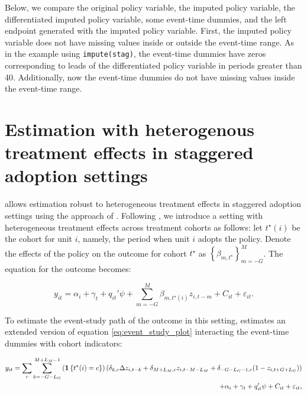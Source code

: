 \documentclass[12pt]{article}
\begin{document}
\begin{stlog}
	\nullskip
\end{stlog}

Below, we compare the original policy variable, the imputed policy variable, the differentiated imputed policy variable, some event-time dummies, and the left endpoint generated with the imputed policy variable.
First, the imputed policy variable does not have missing values inside or outside the event-time range.
As in the example using \texttt{impute(stag)}, the event-time dummies have zeros corresponding to leads of the differentiated policy variable in periods greater than 40. Additionally, now the event-time dummies do not have missing values inside the event-time range.

\begin{stlog}
	\nullskip
\end{stlog}

\section{Estimation with heterogenous treatment effects in staggered adoption settings}
\label{sec:sunabraham}

\xtevent allows estimation robust to heterogeneous treatment effects in staggered adoption settings using the approach of \cite{sun2021estimating}.
Following \cite{freyaldenhoven2021visualization}, we introduce a setting with heterogeneous treatment effects across treatment cohorts as follows:
let $t^{\star} (i)$ be the cohort for unit $i$, namely, the period when unit $i$ adopts the policy.
Denote the effects of the policy on the outcome for cohort $t^{\star}$ as $\left\{ \beta_{m,t^{\star}} \right\}_{m=-G}^M$.
The equation for the outcome becomes:

\begin{equation*}
y_{it} =  \alpha_{i} + \gamma_{t} + q_{it}'\psi  + \sum_{m=-G}^{M}\beta_{m,t^{\star}(i)} z_{i,t-m} + C_{it} + \varepsilon_{it}.
\end{equation*}

To estimate the event-study path of the outcome in this setting, \xtevent estimates an extended version of equation \eqref{eq:event_study_plot} interacting the event-time dummies with cohort indicators:

\begin{equation}
    \begin{split}
        y_{it} = \sum_{c} \sum_{k=-G-L_G}^{M+L_M -1} \left(  \mathbf{1}\left\{ t^{\star} (i) = c \right\} \right) \left( \delta_{k,c} \Delta  z_{i,t-k} + \delta_{M+L_M,c} z_{i,t-M-L_M} + \delta_{-G-L_G-1,c}(1-z_{i,t+G+L_G}) \right)
        \\ \centering
        + \alpha_{i} + \gamma_{t} + q'_{it}\psi + C_{it} + \varepsilon_{it},
    \end{split}
    \label{eq:sunabraham}
\end{equation}
\end{document}

